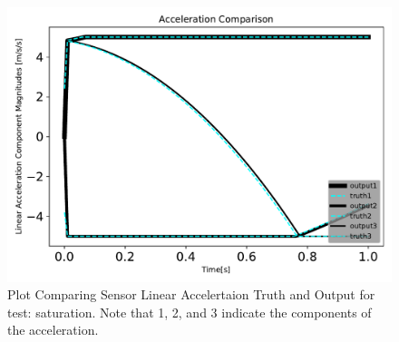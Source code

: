 \begin{figure}[htbp]\centerline{\includegraphics[height=0.7\textwidth, keepaspectratio]{AutoTeX/saturationaccelComparison}}\caption{Plot Comparing Sensor Linear Accelertaion Truth and Output for test: saturation. Note that 1, 2, and 3 indicate the components of the acceleration.}\label{fig:saturationaccelComparison}\end{figure}